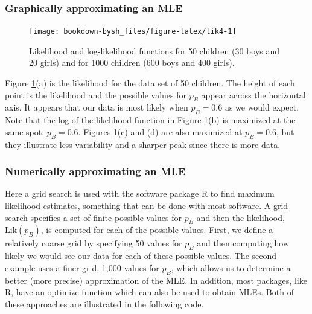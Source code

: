 \documentclass[
]{krantz}
\newcommand{\Lik}{\mathrm{Lik}}
\begin{document}
\hypertarget{MLEgph.sec}{%
\subsubsection{Graphically approximating an MLE}\label{MLEgph.sec}}

\begin{figure}

{\centering \texttt{[image: bookdown-bysh\_files/figure-latex/lik4-1]} 

}

\caption{Likelihood and log-likelihood functions for 50 children (30 boys and 20 girls) and for 1000 children (600 boys and 400 girls).}\label{fig:lik4}
\end{figure}

Figure \ref{fig:lik4}(a) is the likelihood for the data set of 50 children. The height of each point is the likelihood and the possible values for \(p_B\) appear across the horizontal axis. It appears that our data is most likely when \(p_B = 0.6\) as we would expect. Note that the log of the likelihood function in Figure \ref{fig:lik4}(b) is maximized at the same spot: \(p_B = 0.6\). Figures \ref{fig:lik4}(c) and (d) are also maximized at \(p_B = 0.6\), but they illustrate less variability and a sharper peak since there is more data.

\hypertarget{numerically-approximating-an-mle}{%
\subsubsection{Numerically approximating an MLE}\label{numerically-approximating-an-mle}}

Here a grid search is used with the software package R to find maximum likelihood estimates, something that can be done with most software. A grid search specifies a set of finite possible values for \(p_B\) and then the likelihood, \(\Lik(p_B)\), is computed for each of the possible values. First, we define a relatively coarse grid by specifying 50 values for \(p_B\) and then computing how likely we would see our data for each of these possible values. The second example uses a finer grid, 1,000 values for \(p_B\), which allows us to determine a better (more precise) approximation of the MLE. In addition, most packages, like R, have an optimize function which can also be used to obtain MLEs. Both of these approaches are illustrated in the following code.
\end{document}
